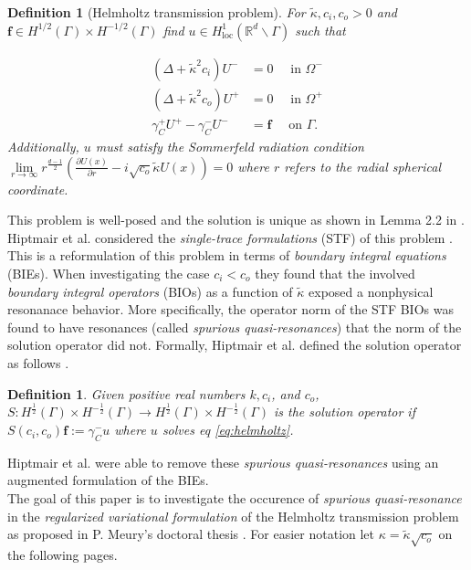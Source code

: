 \documentclass[10pt,journal,compsoc, onecolumn]{IEEEtran}
\newtheorem{definition}[theorem]{Definition}
\begin{document}
\begin{definition}[Helmholtz transmission problem]
For $\tilde \kappa, c_i, c_o > 0$ and \(\mathbf{f} \in H^{1 / 2}(\Gamma) \times H^{-1 / 2}(\Gamma)\) find \(u \in H_{\operatorname{loc}}^{1}\left(\mathbb{R}^{d} \backslash \Gamma\right)\) 
such that

\begin{align}
    \left(\Delta+\tilde\kappa^{2} c_{i}\right) U^{-} &=0  \quad \text { in } \Omega^{-}  \nonumber \\
    \left(\Delta+\tilde\kappa^{2} c_{o}\right) U^{+} &=0  \quad \text { in } \Omega^{+} \label{eq:helmholtz} \\
    \gamma_{C}^{+} U^{+} - \gamma_{C}^{-} U^{-} &=\mathbf{f} \quad  \text { on } \Gamma. \nonumber 
\end{align}
Additionally, $u$ must satisfy the Sommerfeld radiation condition 
\(\lim\limits_{r \rightarrow \infty} r^{\frac{d-1}{2}}\left(\frac{\partial U(x)}{\partial r}-i \sqrt{c_o} \tilde \kappa U(x)\right)=0\) 
where $r$ refers to the radial spherical coordinate. 
\end{definition} 
This problem is well-posed and the solution is unique as shown in Lemma 2.2 in \cite{moiola2019acoustic}.\\
Hiptmair et al. considered the \textit{single-trace formulations} (STF) of this problem  \cite{hiptmair2021spurious}. 
This is a reformulation of this problem in terms of \textit{boundary integral equations} (BIEs). 
When investigating the case $c_i < c_o$ they found that the involved  \textit{boundary integral operators} (BIOs) as a
 function of $\tilde \kappa$ exposed a nonphysical resonanace behavior. 
More specifically, the operator norm of the STF BIOs was found to have resonances (called \textit{spurious quasi-resonances})
that the norm of the solution operator did not.
Formally, Hiptmair et al. defined the solution operator as follows \cite{hiptmair2021spurious}.
\begin{definition}
    Given positive real numbers \(k, c_{i}\), and \(c_{o}\), 
    $S: H^{\frac{1}{2}}(\Gamma) \times H^{-\frac{1}{2}}(\Gamma) \rightarrow  H^{\frac{1}{2}}(\Gamma) \times H^{-\frac{1}{2}}(\Gamma)$ is the solution operator if 
     \(S\left(c_{i}, c_{o}\right) \mathbf{f}:=\gamma_{C}^{-} u\)
    where \(u\) solves eq \ref{eq:helmholtz}.
\end{definition}
Hiptmair et al. were able to remove these \textit{spurious quasi-resonances} 
using an augmented formulation of the BIEs.  \\
The goal of this paper is to investigate the occurence of \textit{spurious quasi-resonance}
in the  \textit{regularized variational formulation} of the Helmholtz transmission problem 
as proposed in P. Meury's doctoral thesis \cite{meury2007stable}. 
For easier notation let $\kappa = \tilde \kappa \sqrt{c_o}$ on the following pages.
\end{document}
